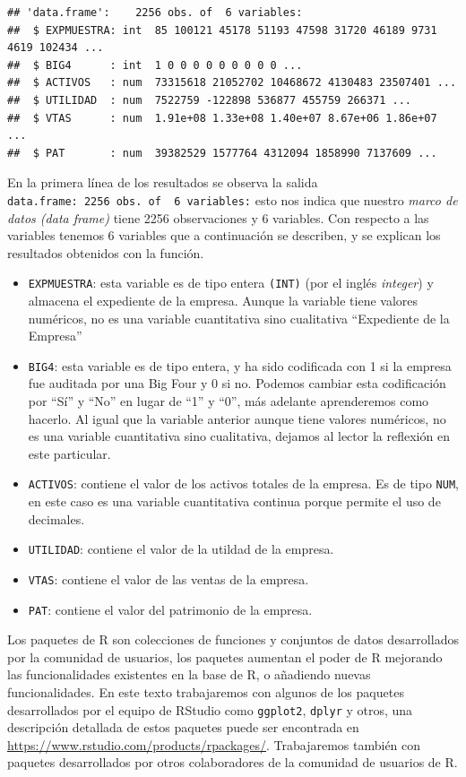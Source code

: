 \documentclass[letterpaper,]{book}
\providecommand{\tightlist}{%
  \setlength{\itemsep}{0pt}\setlength{\parskip}{0pt}}
\begin{document}
\begin{verbatim}
## 'data.frame':    2256 obs. of  6 variables:
##  $ EXPMUESTRA: int  85 100121 45178 51193 47598 31720 46189 9731 4619 102434 ...
##  $ BIG4      : int  1 0 0 0 0 0 0 0 0 0 ...
##  $ ACTIVOS   : num  73315618 21052702 10468672 4130483 23507401 ...
##  $ UTILIDAD  : num  7522759 -122898 536877 455759 266371 ...
##  $ VTAS      : num  1.91e+08 1.33e+08 1.40e+07 8.67e+06 1.86e+07 ...
##  $ PAT       : num  39382529 1577764 4312094 1858990 7137609 ...
\end{verbatim}

En la primera línea de los resultados se observa la salida \texttt{\textquotesingle{}data.frame\textquotesingle{}:\ 2256\ obs.\ of\ \ 6\ variables:} esto nos indica que nuestro \emph{marco de datos (data frame)} tiene 2256 observaciones y 6 variables. Con respecto a las variables tenemos 6 variables que a continuación se describen, y se explican los resultados obtenidos con la función.

\begin{itemize}
\tightlist
\item
  \texttt{EXPMUESTRA}: esta variable es de tipo entera \texttt{(INT)} (por el inglés \emph{integer}) y almacena el expediente de la empresa. Aunque la variable tiene valores numéricos, no es una variable cuantitativa sino cualitativa ``Expediente de la Empresa''
\item
  \texttt{BIG4}: esta variable es de tipo entera, y ha sido codificada con 1 si la empresa fue auditada por una Big Four y 0 si no. Podemos cambiar esta codificación por ``Sí'' y ``No'' en lugar de ``1'' y ``0'', más adelante aprenderemos como hacerlo. Al igual que la variable anterior aunque tiene valores numéricos, no es una variable cuantitativa sino cualitativa, dejamos al lector la reflexión en este particular.
\item
  \texttt{ACTIVOS}: contiene el valor de los activos totales de la empresa. Es de tipo \texttt{NUM}, en este caso es una variable cuantitativa continua porque permite el uso de decimales.
\item
  \texttt{UTILIDAD}: contiene el valor de la utildad de la empresa.
\item
  \texttt{VTAS}: contiene el valor de las ventas de la empresa.
\item
  \texttt{PAT}: contiene el valor del patrimonio de la empresa.
\end{itemize}

Los paquetes de R son colecciones de funciones y conjuntos de datos desarrollados por la comunidad de usuarios, los paquetes aumentan el poder de R mejorando las funcionalidades existentes en la base de R, o añadiendo nuevas funcionalidades. En este texto trabajaremos con algunos de los paquetes desarrollados por el equipo de RStudio como \texttt{ggplot2}, \texttt{dplyr} y otros, una descripción detallada de estos paquetes puede ser encontrada en \url{https://www.rstudio.com/products/rpackages/}. Trabajaremos también con paquetes desarrollados por otros colaboradores de la comunidad de usuarios de R.
\end{document}
